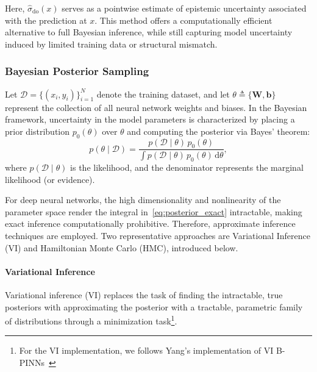 \documentclass[preprint,12pt]{elsarticle}
\begin{document}
Here, $\hat{\sigma}_{\mathrm{do}}(x)$ serves as a pointwise estimate of epistemic uncertainty associated with the prediction at $x$. This method offers a computationally efficient alternative to full Bayesian inference, while still capturing model uncertainty induced by limited training data or structural mismatch.

\subsubsection{Bayesian Posterior Sampling}
\label{sec:sub:bayesian_posterior_sampling}

Let $\mathcal{D} = \{(x_i, y_i)\}_{i=1}^{N}$ denote the training dataset, and let $\theta \triangleq \{\mathbf{W}, \mathbf{b}\}$ represent the collection of all neural network weights and biases. In the Bayesian framework, uncertainty in the model parameters is characterized by placing a prior distribution $p_0(\theta)$ over $\theta$ and computing the posterior via Bayes’ theorem:
\begin{equation}
p(\theta \mid \mathcal{D}) = \frac{p(\mathcal{D} \mid \theta)\, p_0(\theta)}{\int p(\mathcal{D} \mid \theta)\, p_0(\theta)\, \mathrm{d}\theta},
\label{eq:posterior_exact}
\end{equation}
where $p(\mathcal{D} \mid \theta)$ is the likelihood, and the denominator represents the marginal likelihood (or evidence).

For deep neural networks, the high dimensionality and nonlinearity of the parameter space render the integral in~\eqref{eq:posterior_exact} intractable, making exact inference computationally prohibitive. Therefore, approximate inference techniques are employed. Two representative approaches are Variational Inference (VI) and Hamiltonian Monte Carlo (HMC), introduced below.


\paragraph{Variational Inference}
\label{par:bayesian_posterior_sampling}

Variational inference (VI) replaces the task of finding the intractable, true posteriors with approximating the posterior with a tractable, parametric family of distributions through a minimization task\footnote{For the VI implementation, we follows Yang's implementation of VI B-PINNs~\cite{yang_b-pinns_2021}}.
\end{document}
